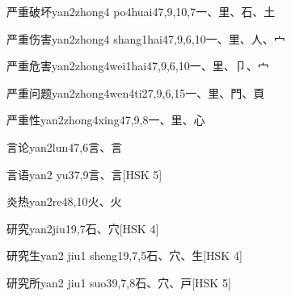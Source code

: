 \begin{entry}{严重破坏}{yan2zhong4 po4huai4}{7,9,10,7}{⼀、⾥、⽯、⼟}
\end{entry}

\begin{entry}{严重伤害}{yan2zhong4 shang1hai4}{7,9,6,10}{⼀、⾥、⼈、⼧}
\end{entry}

\begin{entry}{严重危害}{yan2zhong4wei1hai4}{7,9,6,10}{⼀、⾥、⼙、⼧}
\end{entry}

\begin{entry}{严重问题}{yan2zhong4wen4ti2}{7,9,6,15}{⼀、⾥、⾨、⾴}
\end{entry}

\begin{entry}{严重性}{yan2zhong4xing4}{7,9,8}{⼀、⾥、⼼}
\end{entry}

\begin{entry}{言论}{yan2lun4}{7,6}{⾔、⾔}
\end{entry}

\begin{entry}{言语}{yan2 yu3}{7,9}{⾔、⾔}[HSK 5]
\end{entry}

\begin{entry}{炎热}{yan2re4}{8,10}{⽕、⽕}
\end{entry}

\begin{entry}{研究}{yan2jiu1}{9,7}{⽯、⽳}[HSK 4]
\end{entry}

\begin{entry}{研究生}{yan2 jiu1 sheng1}{9,7,5}{⽯、⽳、⽣}[HSK 4]
\end{entry}

\begin{entry}{研究所}{yan2 jiu1 suo3}{9,7,8}{⽯、⽳、⼾}[HSK 5]
\end{entry}

